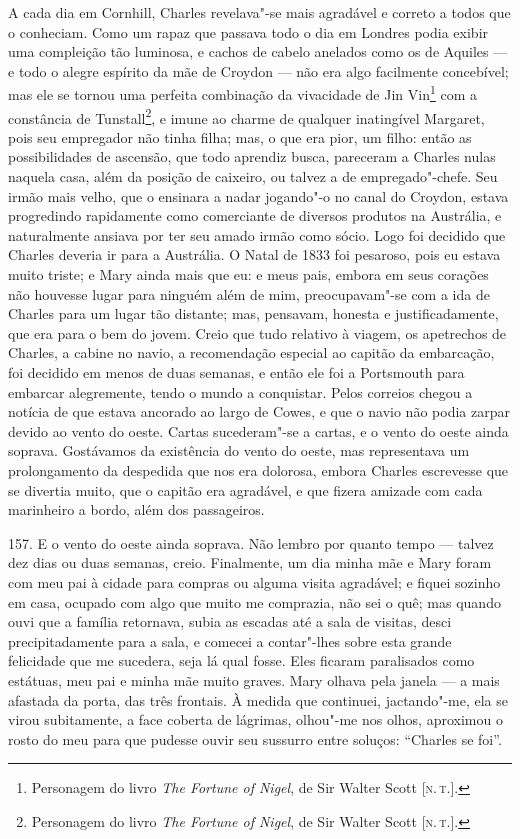 A cada dia em Cornhill, Charles revelava"-se mais agradável e correto a
todos que o conheciam. Como um rapaz que passava todo o dia em Londres
podia exibir uma compleição tão luminosa, e cachos de cabelo anelados
como os de Aquiles --- e todo o alegre espírito da mãe de Croydon --- não
era algo facilmente concebível; mas ele se tornou uma perfeita
combinação da vivacidade de Jin Vin\footnote{Personagem do livro
  \emph{The Fortune of Nigel}, de Sir Walter Scott {[}\textsc{n.\,t.}{]}.} com
a constância de Tunstall\footnote{Personagem do livro \emph{The Fortune
  of Nigel}, de Sir Walter Scott {[}\textsc{n.\,t.}{]}.}, e imune ao charme de
qualquer inatingível Margaret, pois seu empregador não tinha filha; mas,
o que era pior, um filho: então as possibilidades de ascensão, que todo
aprendiz busca, pareceram a Charles nulas naquela casa, além da posição
de caixeiro, ou talvez a de empregado"-chefe. Seu irmão mais velho, que o
ensinara a nadar jogando"-o no canal do Croydon, estava progredindo
rapidamente como comerciante de diversos produtos na Austrália, e
naturalmente ansiava por ter seu amado irmão como sócio. Logo foi
decidido que Charles deveria ir para a Austrália. O Natal de 1833 foi
pesaroso, pois eu estava muito triste; e Mary ainda mais que eu: e meus
pais, embora em seus corações não houvesse lugar para ninguém além de
mim, preocupavam"-se com a ida de Charles para um lugar tão distante;
mas, pensavam, honesta e justificadamente, que era para o bem do jovem.
Creio que tudo relativo à viagem, os apetrechos de Charles, a cabine no
navio, a recomendação especial ao capitão da embarcação, foi decidido em
menos de duas semanas, e então ele foi a Portsmouth para embarcar
alegremente, tendo o mundo a conquistar. Pelos correios chegou a notícia
de que estava ancorado ao largo de Cowes, e que o navio não podia zarpar
devido ao vento do oeste. Cartas sucederam"-se a cartas, e o vento do
oeste ainda soprava. Gostávamos da existência do vento do oeste, mas
representava um prolongamento da despedida que nos era dolorosa, embora
Charles escrevesse que se divertia muito, que o capitão era agradável, e
que fizera amizade com cada marinheiro a bordo, além dos passageiros.

157. E o vento do oeste ainda soprava. Não lembro por quanto tempo ---
talvez dez dias ou duas semanas, creio. Finalmente, um dia minha mãe e
Mary foram com meu pai à cidade para compras ou alguma visita agradável;
e fiquei sozinho em casa, ocupado com algo que muito me comprazia, não
sei o quê; mas quando ouvi que a família retornava, subia as escadas até
a sala de visitas, desci precipitadamente para a sala, e comecei a
contar"-lhes sobre esta grande felicidade que me sucedera, seja lá qual
fosse. Eles ficaram paralisados como estátuas, meu pai e minha mãe muito
graves. Mary olhava pela janela --- a mais afastada da porta, das três
frontais. À medida que continuei, jactando"-me, ela se virou subitamente,
a face coberta de lágrimas, olhou"-me nos olhos, aproximou o rosto do meu
para que pudesse ouvir seu sussurro entre soluços: ``Charles se foi''.

